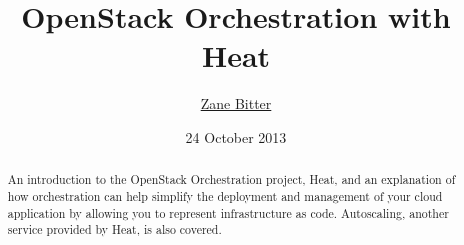 \documentclass{tufte-handout}
\title{OpenStack Orchestration with Heat}
\author{\href{mailto:zbitter@redhat.com}{Zane Bitter}}
\date{24 October 2013}
\begin{document}
\maketitle

\marginnote{\tableofcontents \vspace{2em}}

\begin{abstract}
An introduction to the OpenStack Orchestration project, Heat, and an explanation of how orchestration can help simplify the deployment and management of your cloud application by allowing you to represent infrastructure as code. Autoscaling, another service provided by Heat, is also covered.
\end{abstract}










\end{document}
